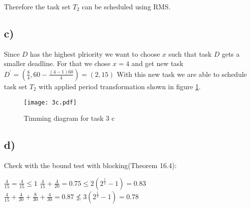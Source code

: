 \documentclass[10pt,a4paper]{article}
\begin{document}
Therefore the task set $T_2$ can be scheduled using RMS.

\subsection*{c)}
Since $D$ has the highest plriority we want to choose $x$ such that task $D$ gets a smaller deadline. 
For that we chose $x=4$ and get new task $D^\prime = (\frac{8}{4}, 60 - \frac{(4 - 1)60}{4}) = (2, 15)$
With this new task we are able to schedule task set $T_2$ with applied period transformation shown in figure \ref{fig:3c}.


\begin{figure}[!h]
\texttt{[image: 3c.pdf]}
\caption{Timming diagram for task 3 c}
\label{fig:3c}
\end{figure}

\subsection*{d)}
Check with the bound test with blocking(Theorem 16.4\cite{Fan:2015:RES:2800613}):

$\frac{4}{15} = \frac{4}{15} \leq 1$
\newline
$\frac{4}{15} + \frac{4}{20} = 0.75 \leq 2(2^{\frac{1}{2}} - 1) = 0.83 $
\newline
$\frac{4}{15} + \frac{4}{20} + \frac{8}{30} + \frac{4}{30} = 0.87 \nleq 3(2^{\frac{1}{3}} - 1) = 0.78$



\end{document}
